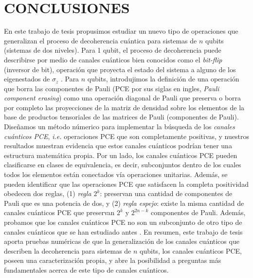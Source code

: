 

\chapter{CONCLUSIONES}
En este trabajo de tesis propusimos estudiar un nuevo tipo de operaciones 
que generalizan el proceso de decoherencia cuántica para sistemas de $n$ qubits 
(sistemas de dos niveles). Para 1 qubit, el proceso de decoherencia
puede describirse por medio de canales cuánticos bien conocidos como 
el \textit{bit-flip} (inversor de bit), operación que proyecta el estado del 
sistema a alguno de los eigenestados de $\sigma_z$
\cite{bengtsson_zyczkowski_2017,nathanson2007pauli,nielsen_chuang_2011}. 
Para $n$ qubits, 
introdujimos la definición de una operación que borra las componentes de Pauli
(PCE por sus siglas en ingles, \textit{Pauli component erasing}) como una 
operación diagonal de Pauli que preserva o borra por completo 
las proyecciones de la matriz de densidad sobre los elementos de la
base de productos tensoriales de las matrices de Pauli (componentes de Pauli). 
Diseñamos un método 
númerico para implementar la búsqueda de los \textit{canales cuánticos PCE},
\textit{i.e.} operaciones PCE que son completamente positivas, y nuestros 
resultados muestran evidencia que estos canales cuánticos podrían tener
una estructura matemática propia. 
Por un lado, los canales cuánticos PCE pueden clasificarse en clases de equivalencia, 
es decir, subconjuntos dentro de los cuales todos los elementos están 
conectados vía operaciones unitarias. 
Además, se pueden identificar que las operaciones PCE 
que satisfacen la completa positividad obedecen dos reglas, (1) \textit{regla
$\mathit{2^k}$}: preservan una cantidad de componentes de Pauli
que es una potencia de dos, y (2) \textit{regla espejo}:
existe la misma cantidad de canales cuánticos PCE que preservan $2^k$ 
y $2^{2n-k}$ componentes de Pauli.
Además, probamos que los canales cuánticos PCE no son un subconjunto
de otro tipo de canales cuánticos que se han estudiado antes 
\cite{nathanson2007pauli}. 
En resumen, este trabajo de tesis aporta pruebas numéricas
de que la generalización de los canales cuánticos que describen la decoherencia
para sistemas de $n$ qubits, los canales cuánticos PCE, poseen una caracterización 
propia, y abre la posibilidad a preguntas más fundamentales acerca de este 
tipo de canales cuánticos.


